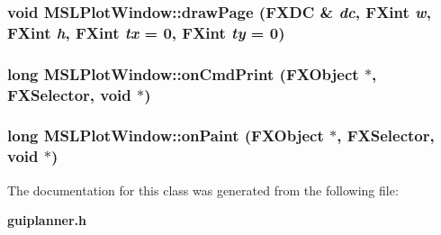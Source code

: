\subsubsection{\setlength{\rightskip}{0pt plus 5cm}void MSLPlot\-Window::draw\-Page (FXDC \& {\em dc}, FXint {\em w}, FXint {\em h}, FXint {\em tx} = 0, FXint {\em ty} = 0)}\label{class_MSLPlotWindow_a3}


\subsubsection{\setlength{\rightskip}{0pt plus 5cm}long MSLPlot\-Window::on\-Cmd\-Print (FXObject $\ast$, FXSelector, void $\ast$)}\label{class_MSLPlotWindow_a1}


\subsubsection{\setlength{\rightskip}{0pt plus 5cm}long MSLPlot\-Window::on\-Paint (FXObject $\ast$, FXSelector, void $\ast$)}\label{class_MSLPlotWindow_a0}




The documentation for this class was generated from the following file:\begin{CompactItemize}
\item 
{\bf guiplanner.h}\end{CompactItemize}
